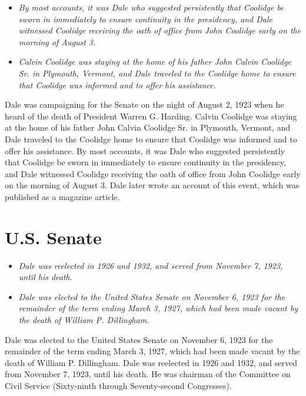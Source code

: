 \begin{itemize}
\item
  \emph{By most accounts, it was Dale who suggested persistently that
  Coolidge be sworn in immediately to ensure continuity in the
  presidency, and Dale witnessed Coolidge receiving the oath of office
  from John Coolidge early on the morning of August 3.}
\item
  \emph{Calvin Coolidge was staying at the home of his father John
  Calvin Coolidge Sr. in Plymouth, Vermont, and Dale traveled to the
  Coolidge home to ensure that Coolidge was informed and to offer his
  assistance.}
\end{itemize}

Dale was campaigning for the Senate on the night of August 2, 1923 when
he heard of the death of President Warren G. Harding. Calvin Coolidge
was staying at the home of his father John Calvin Coolidge Sr. in
Plymouth, Vermont, and Dale traveled to the Coolidge home to ensure that
Coolidge was informed and to offer his assistance. By most accounts, it
was Dale who suggested persistently that Coolidge be sworn in
immediately to ensure continuity in the presidency, and Dale witnessed
Coolidge receiving the oath of office from John Coolidge early on the
morning of August 3. Dale later wrote an account of this event, which
was published as a magazine article.

\section{U.S. Senate}\label{u.s.-senate}

\begin{itemize}
\item
  \emph{Dale was reelected in 1926 and 1932, and served from November 7,
  1923, until his death.}
\item
  \emph{Dale was elected to the United States Senate on November 6, 1923
  for the remainder of the term ending March 3, 1927, which had been
  made vacant by the death of William P. Dillingham.}
\end{itemize}

Dale was elected to the United States Senate on November 6, 1923 for the
remainder of the term ending March 3, 1927, which had been made vacant
by the death of William P. Dillingham. Dale was reelected in 1926 and
1932, and served from November 7, 1923, until his death. He was chairman
of the Committee on Civil Service (Sixty-ninth through Seventy-second
Congresses).

